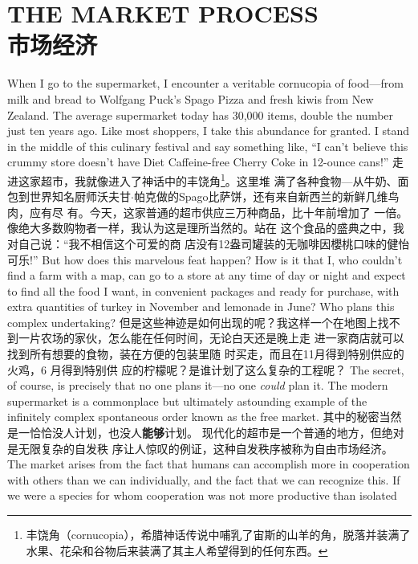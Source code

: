 \chapter{THE MARKET PROCESS\\市场经济}
\begin{paracol}{2}

When I go to the supermarket, I encounter a veritable
cornucopia of food---from milk and bread to Wolfgang Puck's Spago Pizza and fresh kiwis from New Zealand.
The average supermarket today has 30,000 items, double the
number just ten years ago. Like most shoppers, I take this abundance for granted. I stand in the middle of this culinary festival
and say something like, ``I can't believe this crummy store doesn't have Diet Caffeine-free Cherry Coke in 12-ounce cans!''
\switchcolumn
走进这家超市，我就像进入了神话中的丰饶角\footnote{丰饶角（cornucopia），希腊神话传说中哺乳了宙斯的山羊的角，脱落并装满了水果、花朵和谷物后来装满了其主人希望得到的任何东西。}。这里堆
满了各种食物---从牛奶、面包到世界知名厨师沃夫甘$\cdot$帕克做的Spago比萨饼，还有来自新西兰的新鲜几维鸟肉，应有尽
有。今天，这家普通的超市供应三万种商品，比十年前增加了
一倍。像绝大多数购物者一样，我认为这是理所当然的。站在
这个食品的盛典之中，我对自己说：“我不相信这个可爱的商
店没有12盎司罐装的无咖啡因櫻桃口味的健怡可乐!”
\switchcolumn*
But how does this marvelous feat happen? How is it that I,
who couldn't find a farm with a map, can go to a store at any
time of day or night and expect to find all the food I want, in
convenient packages and ready for purchase, with extra quantities of turkey in November and lemonade in June? Who plans
this complex undertaking?
\switchcolumn
但是这些神迹是如何出现的呢？我这样一个在地图上找不
到一片农场的家伙，怎么能在任何时间，无论白天还是晚上走
进一家商店就可以找到所有想要的食物，装在方便的包装里随
时买走，而且在11月得到特别供应的火鸡，6 月得到特别供
应的柠檬呢？是谁计划了这么复杂的工程呢？
\switchcolumn*
The secret, of course, is precisely that no one plans it---no
one \textit{could} plan it. The modern supermarket is a commonplace
but ultimately astounding example of the infinitely complex
spontaneous order known as the free market.
\switchcolumn
其中的秘密当然是一恰恰没人计划，也没人\textbf{能够}计划。
现代化的超市是一个普通的地方，但绝对是无限复杂的自发秩
序让人惊叹的例证，这种自发秩序被称为自由市场经济。
\switchcolumn*
The market arises from the fact that humans can accomplish
more in cooperation with others than we can individually, and
the fact that we can recognize this. If we were a species for
whom cooperation was not more productive than isolated

\end{paracol}

